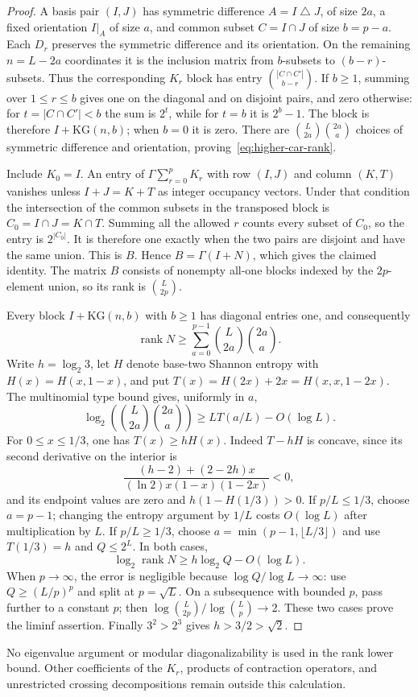 \begin{proof}
A basis pair $(I,J)$ has symmetric difference $A=I\mathbin\triangle J$, of size $2a$,
a fixed orientation $I|_A$ of size $a$, and common subset
$C=I\cap J$ of size $b=p-a$. Each $D_r$ preserves the symmetric difference and its
orientation. On the remaining $n=L-2a$ coordinates it is the inclusion
matrix from $b$-subsets to $(b-r)$-subsets. Thus the corresponding
$K_r$ block has entry
$\binom{|C\cap C'|}{b-r}$. If $b\ge1$, summing over $1\le r\le b$
gives one on the diagonal and on disjoint pairs, and zero otherwise:
for $t=|C\cap C'|<b$ the sum is $2^t$, while for $t=b$ it is $2^b-1$.
The block is therefore $I+\mathrm{KG}(n,b)$; when $b=0$ it is zero.
There are $\binom L{2a}\binom{2a}a$ choices of symmetric difference and orientation,
proving~\eqref{eq:higher-car-rank}.

Include $K_0=I$. An entry of $\Gamma\sum_{r=0}^pK_r$ with row
$(I,J)$ and column $(K,T)$ vanishes unless
$I+J=K+T$ as integer occupancy vectors. Under that condition the
intersection of the common subsets in the transposed block is
$C_0=I\cap J=K\cap T$. Summing all the allowed $r$ counts every
subset of $C_0$, so the entry is $2^{|C_0|}$. It is therefore one
exactly when the two pairs are disjoint and have the same union.
This is $B$. Hence $B=\Gamma(I+N)$, which gives the claimed identity.
The matrix $B$ consists of nonempty all-one blocks indexed by the
$2p$-element union, so its rank is $\binom L{2p}$.

Every block $I+\mathrm{KG}(n,b)$ with $b\ge1$ has diagonal entries
one, and consequently
\[
 \operatorname{rank}N\ge
 \sum_{a=0}^{p-1}\binom L{2a}\binom{2a}a.
\]
Write $h=\log_2 3$, let $H$ denote base-two Shannon entropy with
$H(x)=H(x,1-x)$, and put
$T(x)=H(2x)+2x=H(x,x,1-2x)$.
The multinomial type bound gives, uniformly in $a$,
\[
 \log_2\left(\binom L{2a}\binom{2a}a\right)
 \ge L T(a/L)-O(\log L).
\]
For $0\le x\le1/3$, one has $T(x)\ge hH(x)$.
Indeed $T-hH$ is concave, since its second derivative on the
interior is
\[
 \frac{(h-2)+(2-2h)x}
      {(\ln2)x(1-x)(1-2x)}<0,
\]
and its endpoint values are zero and $h(1-H(1/3))>0$.
If $p/L\le1/3$, choose $a=p-1$; changing the entropy argument by
$1/L$ costs $O(\log L)$ after multiplication by $L$.
If $p/L\ge1/3$, choose $a=\min(p-1,\lfloor L/3\rfloor)$ and use
$T(1/3)=h$ and $Q\le2^L$. In both cases,
\[
 \log_2\operatorname{rank}N\ge h\log_2Q-O(\log L).
\]
When $p\to\infty$, the error is negligible because
$\log Q/\log L\to\infty$: use $Q\ge(L/p)^p$ and split at
$p=\sqrt L$. On a subsequence with bounded $p$, pass further to a
constant $p$; then $\log\binom L{2p}/\log\binom Lp\to2$.
These two cases prove the liminf assertion.
Finally $3^2>2^3$ gives $h>3/2>\sqrt2$.
\end{proof}

No eigenvalue argument or modular diagonalizability is used in the
rank lower bound. Other coefficients of the $K_r$, products of
contraction operators, and unrestricted crossing decompositions
remain outside this calculation.
